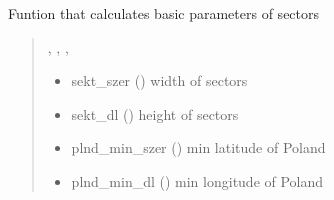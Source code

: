\documentclass[letterpaper,10pt,english]{sphinxmanual}
\begin{document}
\begin{fulllineitems}
\label{\detokenize{geo_utilities:geo_utilities.get_sectors_params}}
\pysigstartsignatures
{}
\pysigstopsignatures
\sphinxAtStartPar
Funtion that calculates basic parameters of sectors
\begin{quote}\begin{description}
\sphinxAtStartPar
\sphinxcode{\sphinxupquote{Tuple}}{[}, , , \sphinxcode{\sphinxupquote{int}}{]}

\sphinxAtStartPar
\begin{itemize}
\item {} 
\sphinxAtStartPar
sekt\_szer () \sphinxhyphen{} width of sectors

\item {} 
\sphinxAtStartPar
sekt\_dl () \sphinxhyphen{} height of sectors

\item {} 
\sphinxAtStartPar
plnd\_min\_szer () \sphinxhyphen{} min latitude of Poland

\item {} 
\sphinxAtStartPar
plnd\_min\_dl () \sphinxhyphen{} min longitude of Poland

\end{itemize}


\end{description}\end{quote}

\end{fulllineitems}

\end{document}
